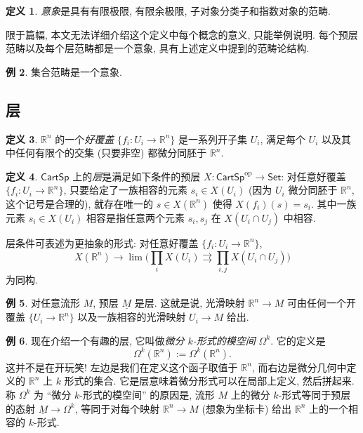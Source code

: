 \documentclass{article}
\theoremstyle{definition}
\newtheorem{definition}{定义}[section]
\newtheorem{example}[definition]{例}
\newcommand{\CartSp}{\mathsf{CartSp}}
\newcommand{\Set}{\mathsf{Set}}
\newcommand{\op}{\mathrm{op}}
\begin{document}
	\begin{definition}
		\emph{意象}是具有有限极限, 有限余极限, 子对象分类子和指数对象的范畴.
	\end{definition}
	
	限于篇幅, 本文无法详细介绍这个定义中每个概念的意义, 只能举例说明. 
	每个预层范畴以及每个层范畴都是一个意象, 具有上述定义中提到的范畴论结构.
	
	\begin{example}
		集合范畴是一个意象.
	\end{example}
	
	\subsection{层}
	
	\begin{definition}
		$\mathbb{R}^n$ 的一个\emph{好覆盖} $\{f_i\colon U_i\to \mathbb{R}^n\}$ 是一系列开子集 $U_i$, 满足每个 $U_i$ 以及其中任何有限个的交集 (只要非空) 都微分同胚于 $\mathbb{R}^n$.
	\end{definition}
	
	\begin{definition}
		$\CartSp$ 上的\emph{层}是满足如下条件的预层 $X\colon \CartSp^\op\to\Set$:
		对任意好覆盖 $\{f_i\colon U_i\to \mathbb{R}^n\}$,
		只要给定了一族相容的元素 $s_i\in X(U_i)$ (因为 $U_i$ 微分同胚于 $\mathbb{R}^n$, 这个记号是合理的), 就存在唯一的 $s\in X(\mathbb{R}^n)$ 使得 $X(f_i)(s)=s_i$.
		其中一族元素 $s_i\in X(U_i)$ 相容是指任意两个元素 $s_i,s_j$ 在 $X(U_i\cap U_j)$ 中相容.
		
		层条件可表述为更抽象的形式: 对任意好覆盖 $\{f_i\colon U_i\to\mathbb{R}^n\}$,
		$$
		X(\mathbb{R}^n)\to\lim\Big({\prod_{i}X(U_i)\rightrightarrows \prod_{i,j}X(U_i\cap U_j)}\Big)
		$$
		为同构.
	\end{definition}
	
	\begin{example}
		对任意流形 $M$, 预层 $\underline{M}$ 是层. 这就是说, 光滑映射 $\mathbb{R}^n\to M$ 可由任何一个开覆盖 $\{U_i\to \mathbb{R}^n\}$ 以及一族相容的光滑映射 $U_i\to M$ 给出.
	\end{example}
	
	\begin{example}
		现在介绍一个有趣的层, 它叫做\emph{微分 $k$-形式的模空间} $\Omega^k$. 它的定义是
		$$
		\Omega^k(\mathbb{R}^n):=\Omega^k(\mathbb{R}^n).
		$$
		这并不是在开玩笑! 左边是我们在定义这个函子取值于 $\mathbb{R}^n$, 而右边是微分几何中定义的 $\mathbb{R}^n$ 上 $k$ 形式的集合. 它是层意味着微分形式可以在局部上定义, 然后拼起来. 称 $\Omega^k$ 为 ``微分 $k$-形式的模空间'' 的原因是, 流形 $M$ 上的微分 $k$-形式等同于预层的态射 $\underline{M}\to\Omega^k$, 等同于对每个映射 $\mathbb{R}^n\to M$ (想象为坐标卡) 给出 $\mathbb{R}^n$ 上的一个相容的 $k$-形式.
	\end{example}
	
\end{document}

